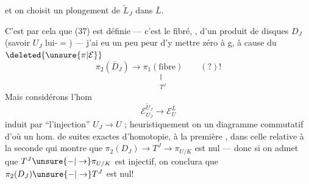 

et on choisit un plongement de $\tilde L_J$ dans $\bar L$.

C'est par cela que (37) est définie --- c'est le  fibré, , d'un produit de disques  $D_J$ (savoir $U_J$ lui-$=$) --- j'ai eu un peu peur d'y mettre  zéro à g, à cause du $\deleted{\unsure{\pi|\mathcal E}}$
\[
\pi_2(\bar D_J)\longrightarrow
\underset{\substack{\Vert\\ T^J}}{\pi_1(\text{fibre})}
\qquad (?)!
\]
Mais considérons l'hom
\[
\mathcal E_{U_J}^{\tilde U_J}\longrightarrow\mathcal E_U^{\bar L}
\]
induit par ``l'injection'' $U_J\longrightarrow U$ ;  heuristiquement on  un diagramme  commutatif
d'où un hom. de suites exactes d'homotopie,  à la première , dans celle relative à la seconde
qui montre que  $\pi_2(D_J)\longrightarrow T^J\longrightarrow\pi_{U/K}$ est nul --- donc si on admet que $T^J\unsure{-|\to}\pi_{U/K}$ est injectif, on conclura que $\pi_2(D_J)\unsure{-|\to}T^J$ est nul!

